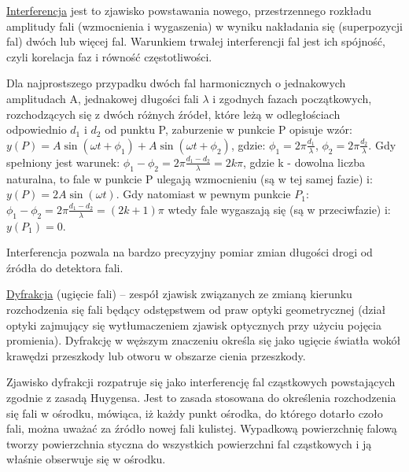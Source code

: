 \underline{Interferencja} jest to zjawisko powstawania nowego, przestrzennego rozkładu amplitudy fali (wzmocnienia i wygaszenia) w wyniku nakładania się (superpozycji fal) dwóch lub więcej fal. Warunkiem trwałej interferencji fal jest ich spójność, czyli korelacja faz i równość częstotliwości. 

Dla najprostszego przypadku dwóch fal harmonicznych o jednakowych amplitudach A, jednakowej długości fali $ \lambda $ i zgodnych fazach początkowych, rozchodzących się z dwóch różnych źródeł, które leżą w odległościach odpowiednio $ d_1 $ i $ d_2 $ od punktu P, zaburzenie w punkcie P opisuje wzór:\newline
$ y(P) = A\sin (\omega t + \phi_1) + A\sin (\omega t + \phi_2)$, gdzie:\newline
$ \phi_1 = 2\pi\frac{d_1}{\lambda} $,\newline
$ \phi_2 = 2\pi\frac{d_2}{\lambda} $.\newline
Gdy spełniony jest warunek:\newline
$ \phi_1 - \phi_2 = 2\pi\frac{d_1-d_2}{\lambda} = 2k\pi $,\newline
gdzie k - dowolna liczba naturalna, to fale w punkcie P ulegają wzmocnieniu (są w tej samej fazie) i:\newline
$ y(P) = 2A\sin (\omega t) $.\newline
Gdy natomiast w pewnym punkcie $ P_1 $:\newline
$ \phi_1 - \phi_2 = 2\pi\frac{d_1-d_2}{\lambda} = (2k+1)\pi $\newline
wtedy fale wygaszają się (są w przeciwfazie) i:\newline
$ y(P_1) = 0 $.

Interferencja pozwala na bardzo precyzyjny pomiar zmian długości drogi od źródła do detektora fali.

\underline{Dyfrakcja} (ugięcie fali) – zespół zjawisk związanych ze zmianą kierunku rozchodzenia się fali będący odstępstwem od praw optyki geometrycznej (dział optyki zajmujący się wytłumaczeniem zjawisk optycznych przy użyciu pojęcia promienia). Dyfrakcję w węższym znaczeniu określa się jako ugięcie światła wokół krawędzi przeszkody lub otworu w obszarze cienia przeszkody.

Zjawisko dyfrakcji rozpatruje się jako interferencję fal cząstkowych powstających zgodnie z zasadą Huygensa. Jest to zasada stosowana do określenia rozchodzenia się fali w ośrodku, mówiąca, iż każdy punkt ośrodka, do którego dotarło czoło fali, można uważać za źródło nowej fali kulistej. Wypadkową powierzchnię falową tworzy powierzchnia styczna do wszystkich powierzchni fal cząstkowych i ją właśnie obserwuje się w ośrodku.

